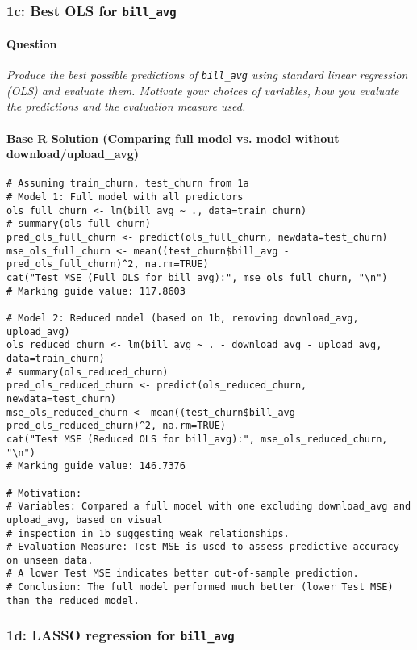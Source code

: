 \documentclass[12pt,a4paper]{article}
\newcommand{\Rcode}[1]{\texttt{#1}} %
\begin{document}
    \subsubsection{1c: Best OLS for \Rcode{bill\_avg}}
        \paragraph{Question}
        \textit{Produce the best possible predictions of \Rcode{bill\_avg} using standard linear regression (OLS) and evaluate them. Motivate your choices of variables, how you evaluate the predictions and the evaluation measure used.}
        \paragraph{Base R Solution (Comparing full model vs. model without download/upload\_avg)}
\begin{lstlisting}
# Assuming train_churn, test_churn from 1a
# Model 1: Full model with all predictors
ols_full_churn <- lm(bill_avg ~ ., data=train_churn)
# summary(ols_full_churn)
pred_ols_full_churn <- predict(ols_full_churn, newdata=test_churn)
mse_ols_full_churn <- mean((test_churn$bill_avg - pred_ols_full_churn)^2, na.rm=TRUE)
cat("Test MSE (Full OLS for bill_avg):", mse_ols_full_churn, "\n")
# Marking guide value: 117.8603

# Model 2: Reduced model (based on 1b, removing download_avg, upload_avg)
ols_reduced_churn <- lm(bill_avg ~ . - download_avg - upload_avg, data=train_churn)
# summary(ols_reduced_churn)
pred_ols_reduced_churn <- predict(ols_reduced_churn, newdata=test_churn)
mse_ols_reduced_churn <- mean((test_churn$bill_avg - pred_ols_reduced_churn)^2, na.rm=TRUE)
cat("Test MSE (Reduced OLS for bill_avg):", mse_ols_reduced_churn, "\n")
# Marking guide value: 146.7376

# Motivation:
# Variables: Compared a full model with one excluding download_avg and upload_avg, based on visual
# inspection in 1b suggesting weak relationships.
# Evaluation Measure: Test MSE is used to assess predictive accuracy on unseen data.
# A lower Test MSE indicates better out-of-sample prediction.
# Conclusion: The full model performed much better (lower Test MSE) than the reduced model.
\end{lstlisting}

    \subsubsection{1d: LASSO regression for \Rcode{bill\_avg}}
\end{document}
